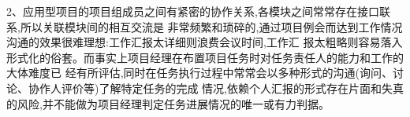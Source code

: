 \documentclass[11pt]{article}
\begin{document}
\begin{comment}
  管理是一个灵活的活动。如果目标是风险管理,我们就要关注风险,尤其是风险的蛛丝蚂迹。这个如何做
  呢?CMMI没有说的明白。但是``警觉''是必须的。一个警觉的人,会经常留意,利用机会。所有提到的,方案评
  审、代码走查、员工交流(正式、非正式)、对外交流、技术研究、测试活动、技术讨论(会议或邮件)、方案
  验证、员工培训等,都是机会,周例会,也是一个机会。还会有其他类型的机会。我们要决定的,是周例会是否
  值得。这个谈起来很有争议性。正反双方都可以提很多道理。但归根结底,是我们是否有效利用好这些机会?如
  果我们说这个形式不好,我们是否用其他方式把事情做好?所以问题不单单在于周例会是否发现风险的效率
  低,而是在于,我们是否用其他方法处理好风险管理了?

  如果我们通过实践,发现在项目里,可以系统地,有效地,发现、识别风险,远远比在周例会作风险管理有
  效,所以不用周例会,那么这个是一个很好的成就,可以作为最佳实践,向其他项目推广。但是如果没有尝试
  过,就有这个结论,这就不很好。

  另一个角度,到底周例会是否能够有效发现风险。这个最终是由员工(包括项目经理)的投入决定的。CMMI提到
  很多很多对项目效率很重要的事情,我们都觉得不重要,所以不想试,或是试一下就说没有效。CMMI只能告诉我
  们什么重要。我们如果要有效,不但需要接受这个因素重要,还要找到有效实施这个因素的方法。但我们真正接
  受某因素是重要的时候,我们就会投入,找方法,并且关注他的有效性。

  在项目的风险的体现,最大的机会,在于任务的延误。延误的原因可以很多,技术,资源、沟通、质量等等问题。
  最终反映的,都是延误。一部分任务,可以在其他的地方发现。但是周例会是检查任务状况的,所以是一个系统
  的发现风险的渠道。是项目里最密切的干系人一起在场,警觉地在了解项目的进展情况,是充满了发现风险的机
  会的。

  下一个问题是如何有效掌握这个机会?答案也是投入,经验,警觉,等等。就是说员工的水平。水平如何建立
  呢?只能通过实践!实践机会那里来呢?在于相信CMMI里说到的重要因素,所以努力找最有效的方法处理这些因
  素。还有其他方法么? 
\end{comment}

\begin{myquote}
2、应用型项目的项目组成员之间有紧密的协作关系,各模块之间常常存在接口联系,所以关联模块间的相互交流是
非常频繁和琐碎的,通过项目例会而达到工作情况沟通的效果很难理想:工作汇报太详细则浪费会议时间,工作汇
报太粗略则容易落入形式化的俗套。而事实上项目经理在布置项目任务时对任务责任人的能力和工作的大体难度已
经有所评估,同时在任务执行过程中常常会以多种形式的沟通(询问、讨论、协作人评价等)了解特定任务的完成
情况,依赖个人汇报的形式存在片面和失真的风险,并不能做为项目经理判定任务进展情况的唯一或有力判据。
\end{myquote}
\end{document}
